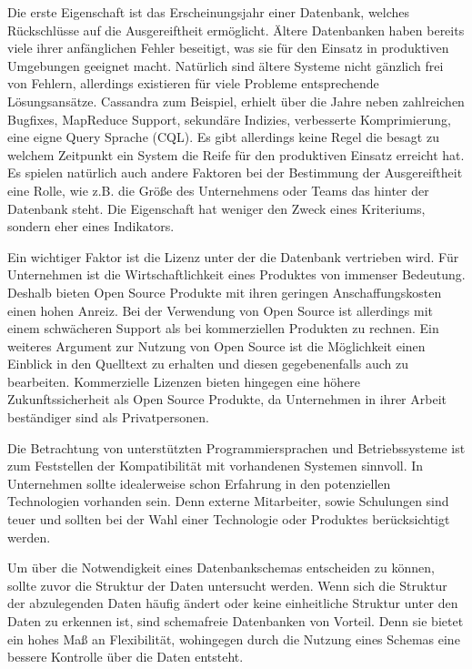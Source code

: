 Die erste Eigenschaft ist das Erscheinungsjahr einer Datenbank, welches Rückschlüsse auf die Ausgereiftheit ermöglicht. Ältere Datenbanken haben bereits viele ihrer anfänglichen Fehler beseitigt, was sie für den Einsatz in produktiven Umgebungen geeignet macht. Natürlich sind ältere Systeme nicht gänzlich frei von Fehlern, allerdings existieren für viele Probleme entsprechende Lösungsansätze. Cassandra zum Beispiel, erhielt über die Jahre neben zahlreichen Bugfixes, MapReduce Support, sekundäre Indizies, verbesserte Komprimierung, eine eigne Query Sprache (CQL). Es gibt allerdings keine Regel die besagt zu welchem Zeitpunkt ein System die Reife für den produktiven Einsatz erreicht hat. Es spielen natürlich auch andere Faktoren bei der Bestimmung der Ausgereiftheit eine Rolle, wie z.B. die Größe des Unternehmens oder Teams das hinter der Datenbank steht. Die Eigenschaft hat weniger den Zweck eines Kriteriums, sondern eher eines Indikators. 

Ein wichtiger Faktor ist die Lizenz unter der die Datenbank vertrieben wird. Für Unternehmen ist die Wirtschaftlichkeit eines Produktes von immenser Bedeutung. Deshalb bieten Open Source Produkte mit ihren geringen Anschaffungskosten einen hohen Anreiz. Bei der Verwendung von Open Source ist allerdings mit einem schwächeren Support als bei kommerziellen Produkten zu rechnen. Ein weiteres Argument zur Nutzung von Open Source ist die Möglichkeit einen Einblick in den Quelltext zu erhalten und diesen gegebenenfalls auch zu bearbeiten. Kommerzielle Lizenzen bieten hingegen eine höhere Zukunftssicherheit als Open Source Produkte, da Unternehmen in ihrer Arbeit beständiger sind als Privatpersonen.

Die Betrachtung von unterstützten Programmiersprachen und Betriebssysteme ist zum Feststellen der Kompatibilität mit vorhandenen Systemen sinnvoll. In Unternehmen sollte idealerweise schon Erfahrung in den potenziellen Technologien vorhanden sein. Denn externe Mitarbeiter, sowie Schulungen sind teuer und sollten bei der Wahl einer Technologie oder Produktes berücksichtigt werden. 

Um über die Notwendigkeit eines Datenbankschemas entscheiden zu können, sollte zuvor die Struktur der Daten untersucht werden. Wenn sich die Struktur der abzulegenden Daten häufig ändert oder keine einheitliche Struktur unter den Daten zu erkennen ist, sind schemafreie Datenbanken von Vorteil. Denn sie bietet ein hohes Maß an Flexibilität, wohingegen durch die Nutzung eines Schemas eine bessere Kontrolle über die Daten entsteht.  



